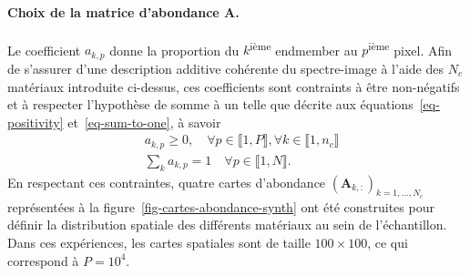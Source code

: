 \paragraph{Choix de la matrice d'abondance $\mathbf{A}$.} Le coefficient $a_{k,p}$ donne la proportion du $k$\textsuperscript{ième} endmember au $p$\textsuperscript{ième} pixel. Afin de s'assurer d'une description additive cohérente du spectre-image à l'aide des $N_c$ matériaux introduite ci-dessus, ces coefficients sont contraints à être non-négatifs et à respecter l'hypothèse de somme à un telle que décrite aux équations~\eqref{eq-positivity} et~\eqref{eq-sum-to-one}, à savoir 
\begin{align}
&a_{k,p} \geq 0,\quad\forall p \in \llbracket 1,P \rrbracket,\forall k\in\llbracket 1,n_c\rrbracket\\
&\sum_k a_{k,p} = 1 \quad \forall p\in\llbracket 1 , N \rrbracket .
\end{align}
En respectant ces contraintes, quatre cartes d'abondance $(\mathbf{A}_{k, :})_{k=1,\dots,N_c}$ représentées à la figure~\ref{fig-cartes-abondance-synth} ont été construites pour définir la distribution spatiale des différents matériaux au sein de l'échantillon. Dans ces expériences, les cartes spatiales sont de taille $100\times 100$, ce qui correspond à $P=10^4$.

